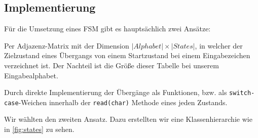 \documentclass[
a4paper,   %
11pt,      %
oneside,   %
onecolumn, %
final      %
]{article}
\newcommand{\code}[1]{\lstinline$#1$}
\begin{document}
\subsection{Implementierung}
Für die Umsetzung eines FSM gibt es hauptsächlich zwei Ansätze:
\begin{description}
\item{Per Adjazenz-Matrix} mit der Dimension $|\mathit{Alphabet}| \times |\mathit{States}|$, in welcher der Zielzustand eines Übergangs von einem Startzustand bei einem Eingabezeichen verzeichnet ist. Der Nachteil ist die Größe dieser Tabelle bei unserem Eingabealphabet.
\item{Durch direkte Implementierung} der Übergänge als Funktionen, bzw. als \code{switch-case}-Weichen innerhalb der \code{read(char)} Methode eines jeden Zustands.
\end{description}
Wir wählten den zweiten Ansatz.
Dazu erstellten wir eine Klassenhierarchie wie in \ref{fig:states} zu sehen.
\end{document}

